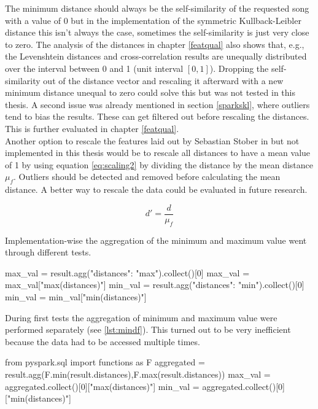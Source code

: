 \noindent The minimum distance should always be the self-similarity of the requested song with a value of 0 but in the implementation of the symmetric Kullback-Leibler distance this isn't always the case, sometimes the self-similarity is just very close to zero. The analysis of the distances in chapter \ref{featqual} also shows that, e.g., the Levenshtein distances and cross-correlation results are unequally distributed over the interval between 0 and 1 (unit interval $[0,1]$). Dropping the self-similarity out of the distance vector and rescaling it afterward with a new minimum distance unequal to zero could solve this but was not tested in this thesis. A second issue was already mentioned in section \ref{sparkskl}, where outliers tend to bias the results. These can get filtered out before rescaling the distances. This is further evaluated in chapter \ref{featqual}.\\
Another option to rescale the features laid out by Sebastian Stober in \cite[pp. 543ff]{musicdata} but not implemented in this thesis would be to rescale all distances to have a mean value of 1 by using equation \ref{eq:scaling2} by dividing the distance by the mean distance $\mu_f$. Outliers should be detected and removed before calculating the mean distance. 
A better way to rescale the data could be evaluated in future research. 

\begin{equation} \label{eq:scaling2}
d' = \frac{d}{\mu_f}
\end{equation} 

\noindent Implementation-wise the aggregation of the minimum and maximum value went through different tests. 

\begin{pythonCode}[frame=single,label={lst:mindf},caption={Minimum and maximum aggregation separate},captionpos=b]
max_val = result.agg({"distances": "max"}).collect()[0]
max_val = max_val["max(distances)"]
min_val = result.agg({"distances": "min"}).collect()[0]
min_val = min_val["min(distances)"]
\end{pythonCode}

\noindent During first tests the aggregation of minimum and maximum value were performed separately (see \ref{lst:mindf}). This turned out to be very inefficient because the data had to be accessed multiple times. 

\begin{pythonCode}[frame=single,label={lst:mindf2},caption={Minimum and maximum aggregation optimized},captionpos=b]
from pyspark.sql import functions as F
aggregated = result.agg(F.min(result.distances),F.max(result.distances))
max_val = aggregated.collect()[0]["max(distances)"]
min_val = aggregated.collect()[0]["min(distances)"]
\end{pythonCode}


